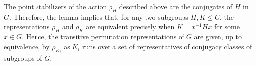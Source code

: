The point stabilizers of the action $\rho_H$ described above are the
conjugates of $H$ in $G$.  Therefore, the lemma implies that, for any two
subgroups $H, K \leq G$, the representations $\rho_H$ and $\rho_K$ are
equivalent precisely when $K = x^{-1} Hx$ for some $x\in G$. 
Hence, the transitive permutation representations of $G$ are given, up to
equivalence, by $\rho_{K_i}$ as $K_i$ runs over a set of representatives of
conjugacy classes of subgroups of $G$.   

